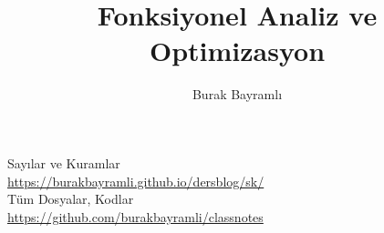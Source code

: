 \documentclass[12pt,a4paper]{report}
\title{Fonksiyonel Analiz ve Optimizasyon}
\author{Burak Bayramlı}
\date{}
\begin{document}
\maketitle

\vspace*{4cm}
\begin{center}
\vspace{0.5cm}
Sayılar ve Kuramlar\\
\vspace{0.5cm}
\url{https://burakbayramli.github.io/dersblog/sk/}\\
\vspace{0.5cm}
Tüm Dosyalar, Kodlar\\
\vspace{0.5cm}
\url{https://github.com/burakbayramli/classnotes}\\
\end{center}
\end{document}
